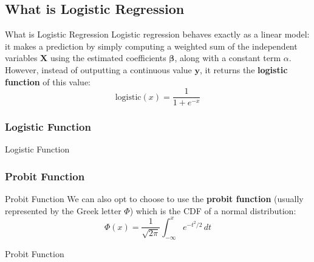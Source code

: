 \subsection{What is Logistic Regression}
\begin{frame}{What is Logistic Regression}
	Logistic regression behaves exactly as a linear model:
	it makes a prediction by simply computing a weighted sum of the
	independent variables $\mathbf{X}$ using the estimated coefficients $\boldsymbol{\beta}$,
	along with a constant term $\alpha$.
	However, instead of outputting a continuous value $\mathbf{y}$,
	it returns the \textbf{logistic function} of this value:
	$$
		\text{logistic}(x) = \frac{1}{1 + e^{-x}}
	$$
\end{frame}


\subsubsection{Logistic Function}

\begin{frame}{Logistic Function}
\end{frame}

\subsubsection{Probit Function}
\begin{frame}{Probit Function}
	We can also opt to choose to use the \textbf{probit function}
	(usually represented by the Greek letter $\Phi$)
	which is the CDF of a normal distribution:
	$$
		\Phi (x)= \frac {1}{\sqrt {2 \pi}}\int _{-\infty }^{x}e^{-t^{2}/2}\,dt
	$$
\end{frame}

\begin{frame}{Probit Function}
\end{frame}

